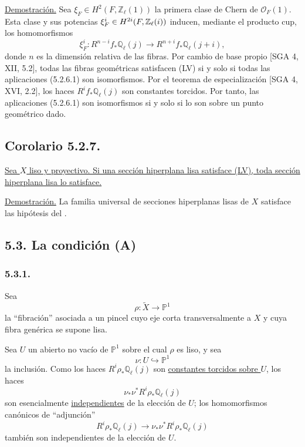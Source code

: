 \noindent\underline{Demostración.}
Sea $\xi_F\in H^2(F,\mathbb Z_\ell(1))$ la primera clase de Chern de
$\mathcal O_F(1)$. Esta clase y sus potencias
$\xi_F^i\in H^{\sisi{ii}{2i}}(F,\mathbb Z_\ell(i))$ inducen, mediante
el producto cup, los homomorfismos
\begin{equation}\tag{5.2.6.1}
\xi_F^i:R^{n-i}f_*\mathbb Q_\ell(j)
\longrightarrow R^{n+i}f_*\mathbb Q_\ell(j+i),
\end{equation}
donde $n$ es la dimensión relativa de las fibras. Por cambio de base
propio [SGA 4, XII, 5.2], todas las fibras geométricas satisfacen (LV)
si y solo si todas las aplicaciones (5.2.6.1) son isomorfismos.
Por el teorema de especialización [SGA 4, XVI, 2.2], los haces
$R^if_*\mathbb Q_\ell(j)$ son constantes torcidos. Por tanto, las
aplicaciones (5.2.6.1) son isomorfismos si y solo si lo son sobre un
punto geométrico dado.

\subsection*{Corolario 5.2.7.}
\underline{Sea $X$ liso y proyectivo. Si una sección hiperplana lisa
satisface (LV), toda sección hiperplana lisa lo satisface.}

\noindent\underline{Demostración.}
La familia universal de secciones hiperplanas lisas de $X$ satisface
las hipótesis del .

\pageoriginale

\subsection*{5.3. La condición (A)}

\subsubsection*{5.3.1.}
Sea
\[
\rho:\widetilde X\longrightarrow\mathbb P^1
\]
la ``fibración'' asociada a un pincel cuyo eje corta transversalmente
a $X$ y cuya fibra genérica se supone lisa.

Sea $U$ un abierto no vacío de $\mathbb P^1$ sobre el cual $\rho$ es
liso, y sea
\begin{equation}\tag{5.3.1.1}
\nu:U\hookrightarrow\mathbb P^1
\end{equation}
la inclusión. Como los haces $R^i\rho_*\mathbb Q_\ell(j)$ son
\underline{constantes torcidos sobre $U$}, los haces
\[
\nu_*\nu^*R^i\rho_*\mathbb Q_\ell(j)
\]
son esencialmente \underline{independientes} de la elección de $U$;
los homomorfismos canónicos de ``adjunción''
\begin{equation}\tag{5.3.2}
R^i\rho_*\mathbb Q_\ell(j)
\longrightarrow
\nu_*\nu^*R^i\rho_*\mathbb Q_\ell(j)
\end{equation}
también son independientes de la elección de $U$.

